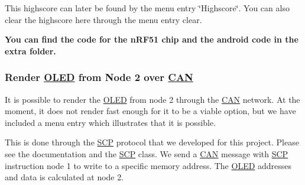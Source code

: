 This highscore can later be found by the menu entry \char`\"{}\+Highscore\char`\"{}. You can also clear the highscore here through the menu entry clear.

{\bfseries You can find the code for the n\+R\+F51 chip and the android code in the extra folder.}

\subsubsection*{Render \hyperlink{class_o_l_e_d}{O\+L\+ED} from Node 2 over \hyperlink{class_c_a_n}{C\+AN}}

It is possible to render the \hyperlink{class_o_l_e_d}{O\+L\+ED} from node 2 through the \hyperlink{class_c_a_n}{C\+AN} network. At the moment, it does not render fast enough for it to be a viable option, but we have included a menu entry which illustrates that it is possible.

This is done through the \hyperlink{class_s_c_p}{S\+CP} protocol that we developed for this project. Please see the documentation and the \hyperlink{class_s_c_p}{S\+CP} class. We send a \hyperlink{class_c_a_n}{C\+AN} message with \hyperlink{class_s_c_p}{S\+CP} instruction node 1 to write to a specific memory address. The \hyperlink{class_o_l_e_d}{O\+L\+ED} addresses and data is calculated at node 2. 